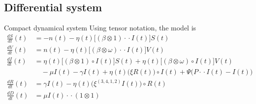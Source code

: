 \documentclass[
11pt,notheorems,hyperref={pdfauthor=whatever}
]{beamer}
\begin{document}
\subsection{Differential system}

\begin{frame}{Compact dynamical system}
	Using tensor notation, the model is
	\begin{align*}
		\frac{dS}{dt}(t)
		 & = -n(t)-\eta(t)\big[(\beta\otimes 1)\cdot\!\cdot I(t)\big]S(t)     \\[0.3em]
		\frac{dV}{dt}(t)
		 & = n(t)-\eta(t)\big[(\beta\otimes \omega)\cdot\!\cdot I(t)\big]V(t) \\[0.3em]
		\frac{dI}{dt}(t)
		 & = \eta(t)\big[(\beta\otimes 1)\circ I(t)\big]S(t)
		+ \eta(t)\big[(\beta\otimes \omega)\circ I(t)\big]V(t)                \\
		 & \quad -\mu I(t)-\gamma I(t)
		+ \eta(t)\big(\xi R(t)\big)\circ I(t)
		+ \Psi\big(P\cdot\!\cdot I(t)-I(t)\big)                               \\[0.3em]
		\frac{dR}{dt}(t)
		 & = \gamma I(t)-\eta(t)\big(\xi^{(3,4,1,2)}I(t)\big)\circ R(t)       \\[0.3em]
		\frac{dD}{dt}(t)
		 & = \mu I(t)\cdot\!\cdot(1\otimes 1)
	\end{align*}
\end{frame}

%
\end{document}
